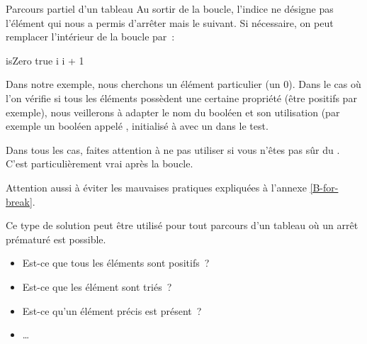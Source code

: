 \begin{Fiche}{Parcours partiel d’un tableau}
		Au sortir de la boucle, l’indice  ne désigne pas l’élément qui
		nous a permis d’arrêter mais le suivant.  Si nécessaire, on peut
		remplacer l’intérieur de la boucle par~:

		\begin{pseudocode}
				\Let isZero \Gets true
			\Else
				\Let i \Gets i + 1
			\EndIf
		\end{pseudocode}
		
		Dans notre exemple, nous cherchons un élément particulier (un 0).  Dans
		le cas où l'on vérifie si tous les éléments possèdent une certaine
		propriété (être positifs par exemple), nous veillerons à adapter le nom
		du booléen et son utilisation (par exemple un booléen appelé
		, initialisé à  avec un  dans le test.

		Dans tous les cas, faites attention à ne pas utiliser  si
		vous n’êtes pas sûr du .  C’est particulièrement vrai après la
		boucle.

		Attention aussi à éviter les mauvaises pratiques 
		expliquées à l’annexe \vref{B-for-break}.
		
					

	Ce type de solution peut être utilisé pour tout parcours d'un tableau où un
	arrêt prématuré est possible. 

	\begin{itemize}
	\item Est-ce que tous les éléments sont positifs~?
	\item Est-ce que les élément sont triés~?
	\item Est-ce qu’un élément précis est présent~?
	\item \dots
	\end{itemize}
	
\end{Fiche}
